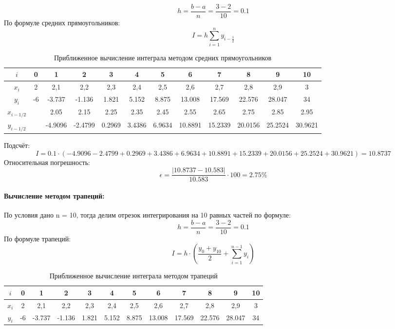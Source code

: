 \documentclass{article}
\begin{document}
\[h=\frac{b-a}{n} = \frac{3-2}{10} = 0.1\]
По формуле средних прямоугольников:
\[I = h\sum_{i=1}^{n}y_{i-\frac{1}{2}}\]
\begin{table}[H]
    \centering
    \begin{tabular}{|c|c|c|c|c|c|c|c|c|c|c|c|}
        \hline
        $i$ & 0 & 1 & 2 & 3 & 4 & 5 & 6& 7& 8& 9& 10\\
        \hline
        $x_i$ & 2 & 2,1 & 2,2& 2,3& 2,4& 2,5& 2,6& 2,7& 2,8& 2,9& 3\\
        \hline
        $y_i$ &-6& -3.737& -1.136& 1.821& 5.152& 8.875& 13.008& 17.569& 22.576& 28.047& 34 \\
        \hline
        $x_{i-1/2}$ & & 2.05 & 2.15 & 2.25 & 2.35 & 2.45& 2.55& 2.65& 2.75& 2.85& 2.95 \\
        \hline
        $y_{i-1/2}$ & & -4.9096& -2.4799& 0.2969& 3.4386& 6.9634& 10.8891& 15.2339& 20.0156& 25.2524& 30.9621 \\
        \hline
        \end{tabular}
        \caption{Приближенное вычисление интеграла методом средних прямоугольников}
        \label{tab:midpoint_approximation}  
\end{table}
Подсчёт:
\[I = 0.1\cdot (-4.9096 -2.4799+ 0.2969+ 3.4386+ 6.9634+ 10.8891+ 15.2339+ 20.0156+ 25.2524+ 30.9621) = 10.8737\]
Относительная погрешность:
\[\epsilon = \frac{|10.8737 - 10.583|}{10.583}\cdot 100 = 2.75\%\]
\\
\textbf{Вычисление методом трапеций:}\\ \\
По условия дано n = 10, тогда делим отрезок интегрирования на 10 равных частей по формуле:
\[h=\frac{b-a}{n} = \frac{3-2}{10} = 0.1\]
По формуле трапеций:
\[I = h\cdot \left(\frac{y_0+y_{10}}{2}+\sum_{i=1}^{n-1}y_i\right)\]
\begin{table}[H]
    \centering
    \begin{tabular}{|c|c|c|c|c|c|c|c|c|c|c|c|}
        \hline
        $i$ & 0 & 1 & 2 & 3 & 4 & 5 & 6& 7& 8& 9& 10\\
        \hline
        $x_i$ & 2 & 2,1 & 2,2& 2,3& 2,4& 2,5& 2,6& 2,7& 2,8& 2,9& 3\\
        \hline
        $y_i$ &-6& -3.737& -1.136& 1.821& 5.152& 8.875& 13.008& 17.569& 22.576& 28.047& 34 \\
        \hline
        \end{tabular}
        \caption{Приближенное вычисление интеграла методом трапеций}
        \label{tab:midpoint_approximation}  
\end{table}
\end{document}
